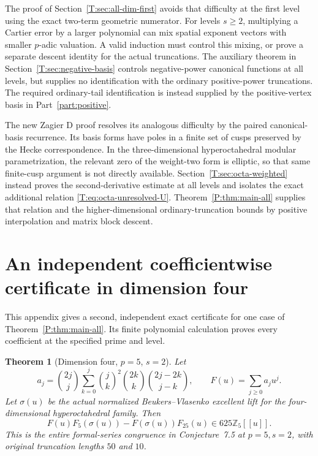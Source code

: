 \documentclass[11pt,a4paper]{article}
\newtheorem{theorem}{Theorem}[section]
\theoremstyle{definition}\newtheorem{definition}[theorem]{Definition}
\theoremstyle{remark}\newtheorem{remark}[theorem]{Remark}
\numberwithin{equation}{section}
\begin{document}
The proof of Section~\ref{T:sec:all-dim-first} avoids that difficulty
at the first level using the exact two-term geometric numerator.
For levels $s\ge2$, multiplying a Cartier error by a larger
polynomial can mix spatial exponent vectors with smaller
$p$-adic valuation.  A valid induction must control this mixing,
or prove a separate descent identity for the actual truncations.
The auxiliary theorem in Section~\ref{T:sec:negative-basis} controls
negative-power canonical functions at all levels, but supplies no
identification with the ordinary positive-power truncations.
The required ordinary-tail identification is instead supplied by the positive-vertex basis in Part~\ref{part:positive}.

The new Zagier D proof resolves its analogous difficulty by the
paired canonical-basis recurrence.  Its basis forms have poles in a
finite set of cusps preserved by the Hecke correspondence.  In the
three-dimensional hyperoctahedral modular parametrization, the
relevant zero of the weight-two form is elliptic, so that same
finite-cusp argument is not directly available.  Section~\ref{T:sec:octa-weighted}
instead proves the second-derivative estimate at all levels and
isolates the exact additional relation \eqref{T:eq:octa-unresolved-U}. Theorem~\ref{P:thm:main-all} supplies that relation and the higher-dimensional ordinary-truncation bounds by positive interpolation and matrix block descent.




\clearpage

\appendix


\section{An independent coefficientwise certificate in dimension four}\label{P:source-appendix-1}
\label{P:sec:octa4-certificate}

This appendix gives a second, independent exact certificate for one
case of Theorem~\ref{P:thm:main-all}. Its finite polynomial calculation
proves every coefficient at the specified prime and level.

\begin{theorem}[Dimension four, \(p=5\), \(s=2\)]
\label{P:thm:octa4-p5-s2}
Let
\[
 a_j=\binom{2j}{j}
       \sum_{k=0}^{j}\binom jk^2\binom{2k}{k}
                             \binom{2j-2k}{j-k},\qquad
 F(u)=\sum_{j\geq0}a_ju^j.
\]
Let \(\sigma(u)\) be the actual normalized Beukers--Vlasenko
excellent lift for the four-dimensional hyperoctahedral family.
Then
\[
 F(u)F_5(\sigma(u))-F(\sigma(u))F_{25}(u)
       \in 625\mathbb Z_5[[u]].
\]
This is the entire formal-series congruence in Conjecture~7.5 at
\(p=5,s=2\), with original truncation lengths \(50\) and \(10\).
\end{theorem}
\end{document}
